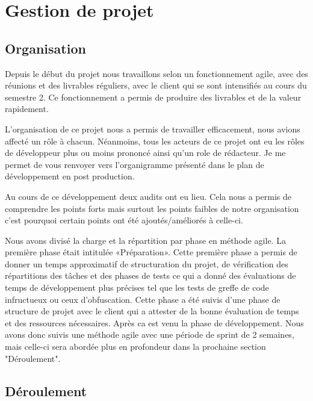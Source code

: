 \chapter{Gestion de projet}

\section{Organisation}

Depuis le début du projet nous travaillons selon un fonctionnement agile, avec des
réunions et des livrables réguliers, avec le client qui se sont intensifiés au cours du semestre 2. Ce fonctionnement a permis de produire des livrables et de
la valeur rapidement.\newline

L'organisation de ce projet nous a permis de travailler efficacement, nous avions affecté un rôle à
chacun. Néanmoins, tous les acteurs de ce projet ont eu les rôles de développeur plus ou moins prononcé ainsi qu'un role de
rédacteur. Je me permet de vous renvoyer vers l'organigramme présenté dans le plan de développement en post production.\newline

Au cours de ce développement deux audits ont eu lieu. Cela nous a permis de comprendre les points forts mais surtout les points faibles de notre
organisation c'est pourquoi certain points ont été ajoutés/améliorés à celle-ci. \newline

Nous avons divisé la charge et la répartition par phase en méthode agile. La première phase était intitulée
«Préparation». Cette première phase a permis de donner un temps approximatif de structuration du
projet, de vérification des répartitions des tâches et des phases de tests ce qui a donné des
évaluations de temps de développement plus précises tel que les tests de greffe de code infructueux ou ceux
d'obfuscation. Cette phase a été suivis d'une phase de structure de projet avec le client qui a attester de la bonne évaluation de temps
et des ressources nécessaires. Après ca est venu la phase de développement. Nous avons donc suivis une méthode agile avec une période de sprint de 2 semaines, mais
celle-ci sera abordée plus en profondeur dans la prochaine section "Déroulement".\newline

\newpage

\section{Déroulement}

